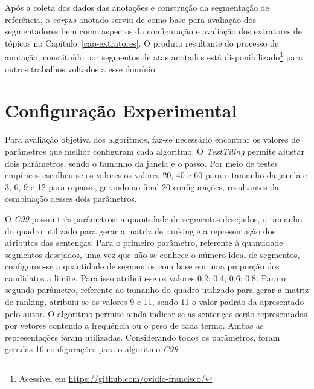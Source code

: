 Após a coleta dos dados das anotações e construção da segmentação de referência, o \textit{corpus} anotado serviu de como base para avaliação dos segmentadores bem como aspectos da configuração e avaliação dos extratores de tópicos no Capítulo~\ref{cap-extratores}. O produto resultante do processo de anotação, constituído por segmentos de atas anotados está disponibilizado\footnote{Acessível em  \url{https://github.com/ovidio-francisco/}} para outros trabalhos voltados a esse domínio. 








\section{Configuração Experimental}
\label{subsec:configuracaoexperimental}

  
Para avaliação objetiva dos algoritmos, faz-se necessário encontrar os valores de parâmetros que melhor configuram cada algoritmo.
O \textit{TextTiling} permite ajustar dois parâmetros, sendo o tamanho da janela e o passo. Por meio de testes empíricos escolheu-se os valores os valores 20, 40 e 60 para o tamanho da janela e 3, 6, 9 e 12 para o passo, gerando ao final 20 configurações, resultantes da combinação desses dois parâmetros.
%

O \textit{C99} possui três parâmetros: 
a quantidade de segmentos desejados, 
o tamanho do quadro utilizado para gerar a matriz de ranking e
a representação dos atributos das sentenças.
Para o primeiro parâmetro, referente à quantidade segmentos desejados, uma vez que não se conhece o número ideal de segmentos, configurou-se a quantidade de segmentos com base em uma proporção dos candidatos a limite. Para isso atribuiu-se os valores {0,2; 0,4; 0,6; 0,8}. 
Para o segundo parâmetro, referente ao tamanho do quadro utilizado para gerar a matriz de ranking, atribuiu-se os valores 9 e 11, sendo 11 o valor padrão da apresentado pelo autor. 
O algoritmo permite ainda indicar se as sentenças serão representadas por vetores contendo a frequência ou o peso de cada termo. Ambas as representações foram utilizadas. Considerando todos os parâmetros, foram geradas 16 configurações para o algoritmo \textit{C99}.

